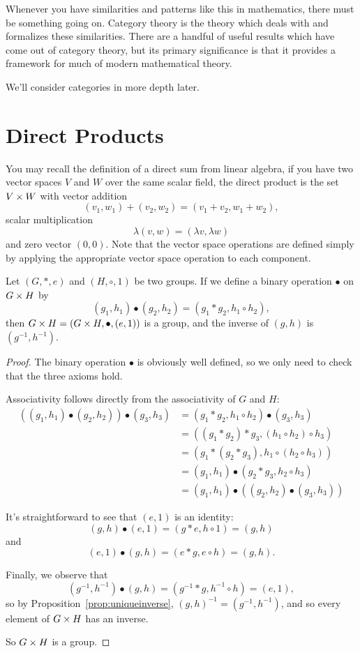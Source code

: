 Whenever you have similarities and patterns like this in mathematics, there
must be something going on. Category theory is the theory which deals with
and formalizes these similarities.  There are a handful of useful results
which have come out of category theory, but its primary significance is that
it provides a framework for much of modern mathematical theory.

We'll consider categories in more depth later.

\section{Direct Products}

You may recall the definition of a direct sum from linear algebra, if you
have two vector spaces $V$ and $W$ over the same scalar field, the direct
product is the set $V \times W$ with vector addition
\[
  (v_{1}, w_{1}) + (v_{2}, w_{2}) = (v_{1} + v_{2}, w_{1} + w_{2}),
\]
scalar multiplication
\[
  \lambda (v, w) = (\lambda v, \lambda w)
\]
and zero vector $(0,0)$.  Note that the vector space operations are defined
simply by applying the appropriate vector space operation to each component.

\begin{theorem}
  Let $(G, \ast, e)$ and $(H, \circ, 1)$ be two groups.  If we define a
  binary operation $\bullet$ on $G \times H$ by
  \[
    (g_{1}, h_{1}) \bullet (g_{2}, h_{2}) = (g_{1} \ast g_{2}, h_{1} \circ h_{2}),
  \]
  then $G \times H = (G \times H, \bullet, (e,1))$ is a group, and the inverse
  of $(g,h)$ is $(g^{-1}, h^{-1})$.
\end{theorem}
\begin{proof}
  The binary operation $\bullet$ is obviously well defined, so we only
  need to check that the three axioms hold.
  
  Associativity follows directly from the associativity of $G$ and $H$:
  \begin{align*}
    ((g_{1}, h_{1}) \bullet (g_{2}, h_{2})) \bullet (g_{3}, h_{3})
    &= (g_{1} \ast g_{2}, h_{1} \circ h_{2}) \bullet (g_{3}, h_{3}) \\
    &= ((g_{1} \ast g_{2}) \ast g_{3}, (h_{1} \circ h_{2}) \circ h_{3}) \\
    &= (g_{1} \ast (g_{2} \ast g_{3}), h_{1} \circ (h_{2} \circ h_{3})) \\
    &= (g_{1}, h_{1}) \bullet (g_{2} \ast g_{3}, h_{2} \circ h_{3}) \\
    &= (g_{1}, h_{1}) \bullet ((g_{2}, h_{2}) \bullet (g_{3}, h_{3}))
  \end{align*}
  
  It's straightforward to see that $(e,1)$ is an identity:
  \[
    (g, h) \bullet (e, 1) = (g \ast e, h \circ 1) = (g, h)
  \]
  and
  \[
    (e, 1) \bullet (g, h) = (e \ast g, e \circ h) = (g, h).
  \]
  
  Finally, we observe that
  \[
    (g^{-1}, h^{-1}) \bullet (g, h) = (g^{-1} \ast g, h^{-1} \circ h) = (e,1),
  \]
  so by Proposition~\ref{prop:uniqueinverse}, $(g,h)^{-1} = (g^{-1}, h^{-1})$,
  and so every element of $G \times H$ has an inverse.
  
  So $G \times H$ is a group.
\end{proof}

